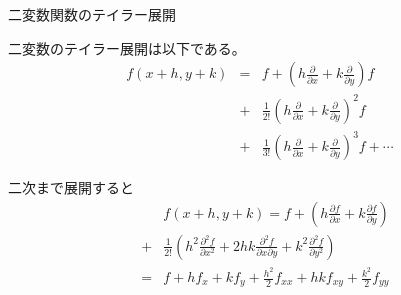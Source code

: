 \begin{slide}{二変数関数のテイラー展開}

二変数のテイラー展開は以下である。
\begin{eqnarray}
f(x+h, y+k) &=& f + \left(h\frac{\partial }{\partial x} + k\frac{\partial}{\partial y}\right) f \nonumber \\ 
&+& \frac{1}{2!}\left(h\frac{\partial }{\partial x} + k\frac{\partial}{\partial y}\right) ^2 f  \nonumber \\
&+& \frac{1}{3!}\left(h\frac{\partial }{\partial x} + k\frac{\partial}{\partial y}\right) ^3f + \cdots \nonumber
\end{eqnarray}

二次まで展開すると
\begin{eqnarray}
&& f(x+h, y+k) =  f + \left(h\frac{\partial f}{\partial x} + k\frac{\partial f}{\partial y}\right)  \nonumber \\ 
&+& \frac{1}{2!}\left(h^2\frac{\partial^2 f}{\partial x^2} + 2hk\frac{\partial^2 f}{\partial x\partial y}+k^2\frac{\partial^2 f}{\partial y^2}\right)  \nonumber \\
&=& f + hf_x + kf_y + \frac{h^2}{2}f_{xx}+ hk f_{xy} + \frac{k^2}{2}f_{yy} \nonumber
\end{eqnarray}

\end{slide}

%
%

